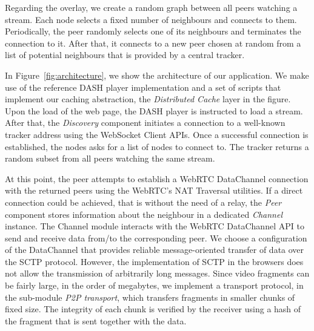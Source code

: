 \documentclass{sig-alternate}
\begin{document}
Regarding the overlay, we create a random graph between all peers watching a stream. Each
node selects a fixed number of neighbours and connects to them. Periodically, the peer
randomly selects one of its neighbours and terminates the connection to it. After that, it
connects to a new peer chosen at random from a list of potential neighbours that is
provided by a central tracker.

In Figure~\ref{fig:architecture}, we show the architecture of our application. We make use
of the reference DASH player implementation and a set of scripts that implement our
caching abstraction, the \textit{Distributed Cache} layer in the figure. Upon the load of
the web page, the DASH player is instructed to load a stream. After that, the
\textit{Discovery} component initiates a connection to a well-known tracker address using
the WebSocket Client APIs. 
Once a successful connection is established, the nodes asks for a list of nodes to connect
to. The tracker returns a random subset from all peers watching the same stream.

At this point, the peer attempts to establish a WebRTC DataChannel connection with the
returned peers using the WebRTC's NAT Traversal utilities. If a direct connection could be
achieved, that is without the need of a relay, the \textit{Peer} component stores
information about the neighbour in a dedicated \textit{Channel} instance. The Channel
module interacts with the WebRTC DataChannel API to send and receive data from/to the
corresponding peer. We choose a configuration of the DataChannel that provides reliable
message-oriented transfer of data over the SCTP protocol. However, the implementation of
SCTP in the browsers does not allow the transmission of arbitrarily long messages. Since
video fragments can be fairly large, in the order of megabytes, we implement a transport
protocol, in the sub-module \textit{P2P transport}, which transfers fragments in smaller
chunks of fixed size. The integrity of each chunk is verified by the receiver using a hash
of the fragment that is sent together with the data.


\end{document}
